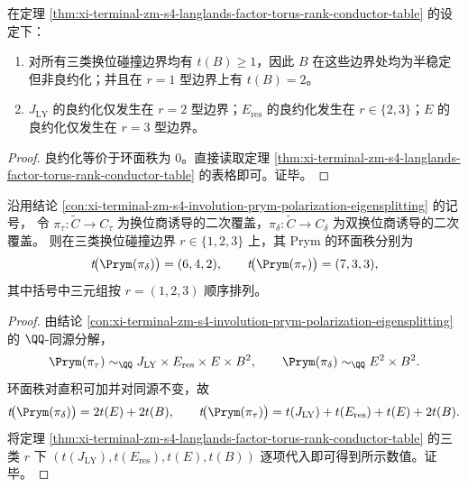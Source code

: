 \begin{corollary}\label{cor:xi-terminal-zm-s4-langlands-factor-collision-selection}
在定理 \ref{thm:xi-terminal-zm-s4-langlands-factor-torus-rank-conductor-table} 的设定下：
\begin{enumerate}
  \item 对所有三类换位碰撞边界均有 \(t(B)\ge 1\)，因此 \(B\) 在这些边界处均为半稳定但非良约化；并且在 \(r=1\) 型边界上有 \(t(B)=2\)。
  \item \(J_{\mathrm{LY}}\) 的良约化仅发生在 \(r=2\) 型边界；\(E_{\mathrm{res}}\) 的良约化发生在 \(r\in\{2,3\}\)；\(E\) 的良约化仅发生在 \(r=3\) 型边界。
\end{enumerate}
\end{corollary}
\begin{proof}
良约化等价于环面秩为 \(0\)。直接读取定理 \ref{thm:xi-terminal-zm-s4-langlands-factor-torus-rank-conductor-table} 的表格即可。证毕。
\end{proof}

\begin{theorem}\label{thm:xi-terminal-zm-s4-prym-torus-rank-layering}
沿用结论 \ref{con:xi-terminal-zm-s4-involution-prym-polarization-eigensplitting} 的记号，
令 \(\pi_\tau:\widetilde C\to C_\tau\) 为换位商诱导的二次覆盖，\(\pi_\delta:\widetilde C\to C_\delta\) 为双换位商诱导的二次覆盖。
则在三类换位碰撞边界 \(r\in\{1,2,3\}\) 上，其 Prym 的环面秩分别为
\[
t\!\bigl(\Prym(\pi_\delta)\bigr)=(6,4,2),
\qquad
t\!\bigl(\Prym(\pi_\tau)\bigr)=(7,3,3),
\]
其中括号中三元组按 \(r=(1,2,3)\) 顺序排列。
\end{theorem}
\begin{proof}
由结论 \ref{con:xi-terminal-zm-s4-involution-prym-polarization-eigensplitting} 的 \(\QQ\)-同源分解，
\[
\Prym(\pi_\tau)\sim_{\QQ} J_{\mathrm{LY}}\times E_{\mathrm{res}}\times E\times B^2,
\qquad
\Prym(\pi_\delta)\sim_{\QQ} E^2\times B^2.
\]
环面秩对直积可加并对同源不变，故
\[
t\!\bigl(\Prym(\pi_\delta)\bigr)=2t(E)+2t(B),
\qquad
t\!\bigl(\Prym(\pi_\tau)\bigr)=t(J_{\mathrm{LY}})+t(E_{\mathrm{res}})+t(E)+2t(B).
\]
将定理 \ref{thm:xi-terminal-zm-s4-langlands-factor-torus-rank-conductor-table} 的三类 \(r\) 下 \((t(J_{\mathrm{LY}}),t(E_{\mathrm{res}}),t(E),t(B))\) 逐项代入即可得到所示数值。证毕。
\end{proof}

\endinput
